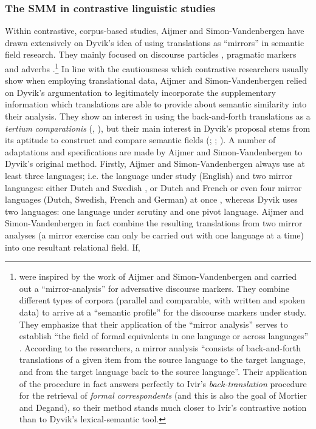\subsubsection{The SMM in contrastive linguistic studies}\label{sec:2.3.4.4}\largerpage[2]
Within contrastive, corpus-based studies, Aijmer and Simon-Vandenbergen have drawn extensively on Dyvik’s idea of using translations as “mirrors” in semantic field research. They mainly focused on discourse particles \citep{simon-vandenbergen_english_2013}, pragmatic markers \citep{simon-vandenbergen_expectation_2002,aijmer_model_2004,fischer_pragmatic_2006} and adverbs \citep{simon-vandenbergen_semantic_2007,simon-vandenbergen_english_2013}.\footnote{\citet{mortier_adversative_2009} were inspired by the work of Aijmer and Simon-Vandenbergen and carried out a “mirror-analysis” for adversative discourse markers. They combine different types of corpora (parallel and comparable, with written and spoken data) to arrive at a “semantic profile” for the discourse markers under study. They emphasize that their application of the “mirror analysis” serves to establish “the field of formal equivalents in one language or across languages” \citep[309]{mortier_adversative_2009}. According to the researchers, a mirror analysis “consists of back-and-forth translations of a given item from the source language to the target language, and from the target language back to the source language”. Their application of the procedure in fact answers perfectly to Ivir’s \textit{back-translation} procedure for the retrieval of \textit{formal correspondents} (and this is also the goal of Mortier and Degand), so their method stands much closer to Ivir’s contrastive notion than to Dyvik’s lexical-semantic tool.} In line with the cautiousness which contrastive researchers usually show when employing translational data, Aijmer and Simon-Vandenbergen relied on Dyvik’s argumentation to legitimately incorporate the supplementary information which translations are able to provide about semantic similarity into their analysis. They show an interest in using the back-and-forth translations as a \textit{tertium} \textit{comparationis} (\citealt[16]{simon-vandenbergen_expectation_2002}, \citealt[1795]{aijmer_model_2004}), but their main interest in Dyvik’s proposal stems from its aptitude to construct and compare semantic fields (\citealt[1131]{aijmer_discourse_2003}; \citeyear[1782]{aijmer_model_2004}; \citealt[13]{simon-vandenbergen_expectation_2002}). A number of adaptations and specifications are made by Aijmer and Simon-Vandenbergen to Dyvik’s original method. Firstly, Aijmer and Simon-Vandenbergen always use at least three languages; i.e. the language under study (English) and two mirror languages: either Dutch and Swedish \citep{aijmer_model_2004}, or Dutch and French \citep{simon-vandenbergen_english_2013} or even four mirror languages (Dutch, Swedish, French and German) at once \citep{simon-vandenbergen_semantic_2007}, whereas Dyvik uses two languages: one language under scrutiny and one pivot language. Aijmer and Simon-Vandenbergen in fact combine the resulting translations from two mirror analyses (a mirror exercise can only be carried out with one language at a time) into one resultant relational field. If, 